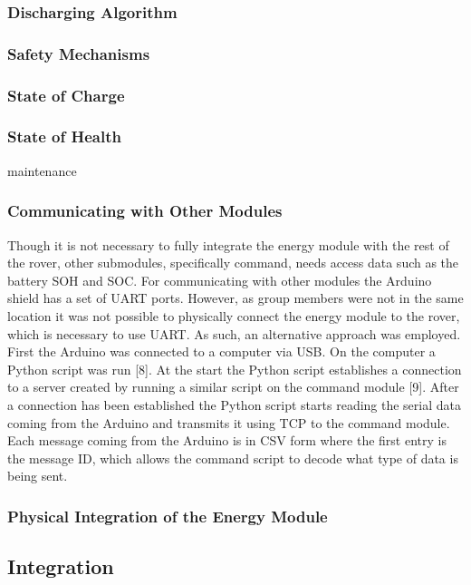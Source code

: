 \documentclass[a4paper]{article}
\begin{document}
\subsubsection{Discharging Algorithm}

\subsubsection{Safety Mechanisms}

\subsubsection{State of Charge}

\subsubsection{State of Health}
maintenance

\subsubsection{Communicating with Other Modules}
Though it is not necessary to fully integrate the energy module with the rest of the rover, other submodules, specifically command, needs access data such as the battery SOH and SOC. For communicating with other modules the Arduino shield has a set of UART ports. However, as group members were not in the same location it was not possible to physically connect the energy module to the rover, which is necessary to use UART. As such, an alternative approach was employed. First the Arduino was connected to a computer via USB. On the computer a Python script was run [8]. At the start the Python script establishes a connection to a server created by running a similar script on the command module [9]. After a connection has been established the Python script starts reading the serial data coming from the Arduino and transmits it using TCP to the command module. Each message coming from the Arduino is in CSV form where the first entry is the message ID, which allows the command script to decode what type of data is being sent. 

\subsubsection{Physical Integration of the Energy Module}


\subsection{Integration}
\end{document}
